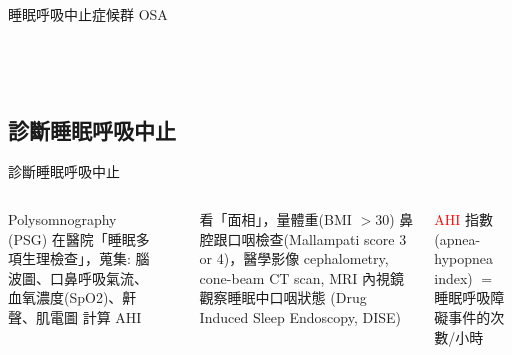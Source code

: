 \documentclass[aspectratio=169]{beamer}
\begin{document}
\begin{frame}{睡眠呼吸中止症候群 OSA}
\begin{columns}{~}
\begin{tikzpicture}
\end{tikzpicture}

\end{columns}

\end{frame}

\subsection{診斷睡眠呼吸中止}
\begin{frame}{診斷睡眠呼吸中止}
\begin{columns}
        \begin{outline}
        \1 Polysomnography (PSG) 在醫院「睡眠多項生理檢查」，蒐集:
        \2 腦波圖、口鼻呼吸氣流、血氧濃度(SpO2)、鼾聲、肌電圖
        \2 計算 AHI

        \end{outline}
~\\    
~\\
~\\
~\\
~\\
~\\
        \begin{outline}
        \1 看「面相」，量體重(BMI $> 30$)
        \1 鼻腔跟口咽檢查(Mallampati score 3 or 4)，醫學影像
        \2 cephalometry, cone-beam CT scan, MRI
        \1 內視鏡觀察睡眠中口咽狀態 (Drug Induced Sleep Endoscopy, DISE) 
    \end{outline}
    
    \textcolor{red}{AHI} 指數(apnea-hypopnea index) $=$ 睡眠呼吸障礙事件的次數/小時
    ~\\
    ~\\
        \centering


\end{columns}
\end{frame}
\end{document}
